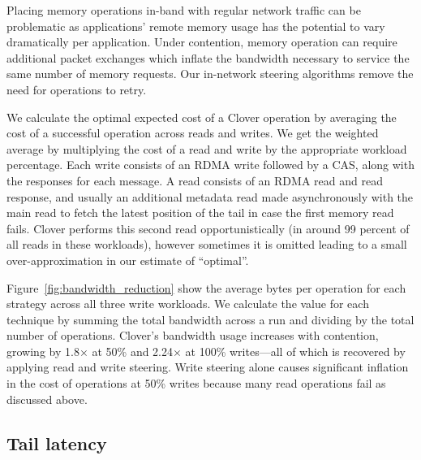 Placing memory operations in-band with regular network traffic can be
problematic as applications' remote memory usage has the potential to
vary dramatically per application.  Under contention, memory operation
can require additional packet exchanges which inflate the bandwidth
necessary to service the same number of memory requests. Our
in-network steering algorithms remove the need for operations to
retry.


We calculate the optimal expected cost of a Clover operation by
averaging the cost of a successful operation across reads and
writes. We get the weighted average by multiplying the cost of a read
and write by the appropriate workload percentage. Each write consists
of an RDMA write followed by a CAS, along with the responses for each
message. A read consists of an RDMA read and read response, and
usually an additional metadata read made asynchronously with the main
read to fetch the latest position of the tail in case the first memory
read fails. Clover performs this second read opportunistically (in
around 99 percent of all reads in these workloads), however sometimes
it is omitted leading to a small over-approximation in our estimate of
``optimal''.

Figure~\ref{fig:bandwidth_reduction} show the average bytes per
operation for each strategy across all three write workloads. We
calculate the value for each technique by summing the total bandwidth
across a run and dividing by the total number of operations. Clover's
bandwidth usage increases with contention, growing by 1.8$\times$ at
50\% and 2.24$\times$ at 100\% writes---all of which is recovered by
applying read and write steering. Write steering alone causes
significant inflation in the cost of operations at 50\% writes because many
read operations fail as discussed above.

\subsection{Tail latency}

